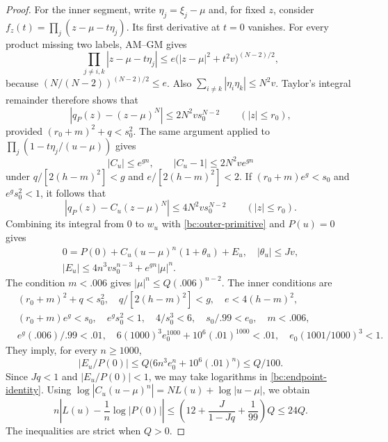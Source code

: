 \begin{proof}
For the inner segment, write $\eta_j=\xi_j-\mu$ and, for fixed $z$,
consider
$f_z(t)=\prod_j(z-\mu-t\eta_j)$.  Its first derivative at $t=0$
vanishes.  For every product missing two labels, AM--GM gives
\[
 \prod_{j\ne i,k}|z-\mu-t\eta_j|
 \leq e\bigl(|z-\mu|^2+t^2v\bigr)^{(N-2)/2},
\]
because $(N/(N-2))^{(N-2)/2}\leq e$.  Also
$\sum_{i\ne k}|\eta_i\eta_k|\leq N^2v$.
Taylor's integral remainder therefore shows that
\[
 |q_P(z)-(z-\mu)^N|\leq2N^2vs_0^{N-2}
 \qquad(|z|\leq r_0),
\]
provided $(r_0+m)^2+q<s_0^2$.  The same argument applied to
$\prod_j(1-t\eta_j/(u-\mu))$ gives
\[
 |C_u|\leq e^{gn},\qquad
 |C_u-1|\leq2N^2ve^{gn}
\]
under $q/[2(h-m)^2]<g$ and $e/[2(h-m)^2]<2$.
If $(r_0+m)e^g<s_0$ and $e^gs_0^2<1$, it follows that
\[
 |q_P(z)-C_u(z-\mu)^N|\leq4N^2vs_0^{N-2}
 \qquad(|z|\leq r_0).
\]
Combining its integral from $0$ to $w_u$ with
\eqref{bc:outer-primitive} and $P(u)=0$ gives
\begin{equation}\label{bc:endpoint-identity}
\begin{gathered}
 0=P(0)+C_u(u-\mu)^n(1+\theta_u)+E_u,\quad
 |\theta_u|\leq Jv,\\
 |E_u|\leq4n^3vs_0^{n-3}+e^{gn}|\mu|^n.
\end{gathered}
\end{equation}
The condition $m<.006$ gives $|\mu|^n\leq Q(.006)^{n-2}$.
The inner conditions are
\begin{align}
 &(r_0+m)^2+q<s_0^2,\quad
   q/[2(h-m)^2]<g,\quad e<4(h-m)^2,\nonumber\\
 &(r_0+m)e^g<s_0,\quad e^gs_0^2<1,\quad
   4/s_0^3<6,\quad s_0/.99<e_0,\quad m<.006,\nonumber\\
 &e^g(.006)/.99<.01,\quad
   6(1000)^3e_0^{1000}+10^6(.01)^{1000}<.01,\quad
   e_0(1001/1000)^3<1.                            \label{bc:inner-gates}
\end{align}
They imply, for every $n\geq1000$,
\begin{equation}\label{bc:Q-error}
 |E_u/P(0)|\leq Q\bigl(6n^3e_0^n+10^6(.01)^n\bigr)\leq Q/100.
\end{equation}
Since $Jq<1$ and $|E_u/P(0)|<1$, we may take logarithms in
\eqref{bc:endpoint-identity}.  Using
$\log|C_u(u-\mu)^n|=NL(u)+\log|u-\mu|$, we obtain
\[
 n\left|L(u)-\frac1n\log|P(0)|\right|
 \leq\left(12+\frac J{1-Jq}+\frac1{99}\right)Q\leq24Q.
\]
The inequalities are strict when $Q>0$.


\end{proof}
